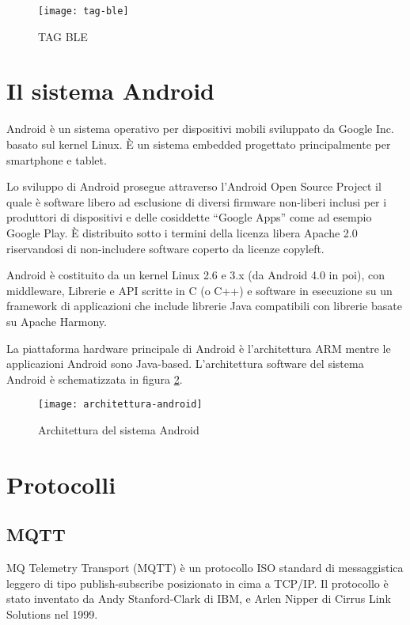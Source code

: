 \begin{figure}[htp]
	\centering
	\texttt{[image: tag-ble]}
	\caption{TAG BLE}
	\label{fig:tag-ble}
\end{figure}

\section{Il sistema Android}
Android \cite{android:site} è un sistema operativo per dispositivi mobili sviluppato da Google Inc. basato sul kernel Linux. È un sistema embedded progettato principalmente per smartphone e tablet.

Lo sviluppo di Android prosegue attraverso l'Android Open Source Project il quale è software libero ad esclusione di diversi firmware non-liberi inclusi per i produttori di dispositivi e delle cosiddette ``Google Apps'' come ad esempio Google Play. È distribuito sotto i termini della licenza libera Apache 2.0 riservandosi di non-includere software coperto da licenze copyleft.

Android è costituito da un kernel Linux 2.6 e 3.x (da Android 4.0 in poi), con middleware, Librerie e API scritte in C (o C++) e software in esecuzione su un framework di applicazioni che include librerie Java compatibili con librerie basate su Apache Harmony.

La piattaforma hardware principale di Android è l'architettura ARM mentre le applicazioni Android sono Java-based. L'architettura software del sistema Android è schematizzata in figura \ref{fig:architettura-android}.

\begin{figure}[htp]
	\centering
	\texttt{[image: architettura-android]}
	\caption{Architettura del sistema Android}
	\label{fig:architettura-android}
\end{figure}

\section{Protocolli}

\subsection{MQTT}
MQ Telemetry Transport (MQTT) \cite{mqtt:site} è un protocollo ISO standard di messaggistica leggero di tipo publish-subscribe posizionato in cima a TCP/IP. Il protocollo è stato inventato da Andy Stanford-Clark di IBM, e Arlen Nipper di Cirrus Link Solutions nel 1999.

